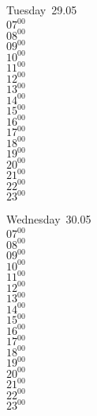 \documentclass[11pt, a4paper]{book}\usepackage[]{graphicx}\usepackage[]{color}
\begin{document}
\begin{weekdaybox}
  Tuesday~29.05\\
  { 
  \vfill
  $07^{00}$\\
$08^{00}$\\
$09^{00}$\\
$10^{00}$\\
$11^{00}$\\
$12^{00}$\\
$13^{00}$\\
$14^{00}$\\
$15^{00}$\\
$16^{00}$\\
$17^{00}$\\
$18^{00}$\\
$19^{00}$\\
$20^{00}$\\
$21^{00}$\\
$22^{00}$\\
$23^{00}$\\
  }
\end{weekdaybox}
\begin{weekdaybox}
  Wednesday~30.05\\
  { 
  \vfill
  $07^{00}$\\
$08^{00}$\\
$09^{00}$\\
$10^{00}$\\
$11^{00}$\\
$12^{00}$\\
$13^{00}$\\
$14^{00}$\\
$15^{00}$\\
$16^{00}$\\
$17^{00}$\\
$18^{00}$\\
$19^{00}$\\
$20^{00}$\\
$21^{00}$\\
$22^{00}$\\
$23^{00}$\\
  }
\end{weekdaybox}
\clearpage
\begin{headerbox}
\end{headerbox}
\end{document}

